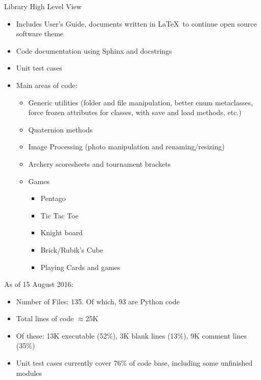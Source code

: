 \documentclass{beamer}
\begin{document}
\begin{frame}{Library High Level View}
    \begin{itemize}
        \item Includes User's Guide, documents written in \LaTeX\  to continue open source software theme
        \item Code documentation using Sphinx and docstrings
        \item Unit test cases
        \item Main areas of code:
        \begin{itemize}
            \item Generic utilities (folder and file manipulation, better enum metaclasses, force frozen attributes for classes, with save and load methods, etc.)
            \item Quaternion methods
            \item Image Processing (photo manipulation and renaming/resizing)
            \item Archery scoresheets and tournament brackets
            \item Games
            \begin{itemize}
                \item Pentago
                \item Tic Tac Toe
                \item Knight board
                \item Brick/Rubik's Cube
                \item Playing Cards and games
            \end{itemize}
        \end{itemize}
    \end{itemize}
\end{frame}

\begin{frame}
    As of 15 August 2016:
    \begin{itemize}
        \item Number of Files: 135.  Of which, 93 are Python code
        \item Total lines of code $\approx$25K
        \item Of these: 13K executable (52\%), 3K blank lines (13\%), 9K comment lines (35\%)
        \item Unit test cases currently cover 76\% of code base, including some unfinished modules
    \end{itemize}
\end{frame}
\end{document}
